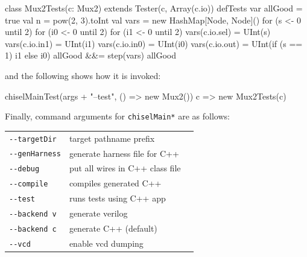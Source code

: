 \documentclass[10pt,twocolumn]{article}
\def\code#1{{\small\tt #1}}
\begin{document}
\begin{scala}
class Mux2Tests(c: Mux2) 
    extends Tester(c, Array(c.io)) {  
  defTests {
    var allGood = true
    val n = pow(2, 3).toInt
    val vars = new HashMap[Node, Node]()
    for (s <- 0 until 2) {
    for (i0 <- 0 until 2) {
    for (i1 <- 0 until 2) {
      vars(c.io.sel) = UInt(s)
      vars(c.io.in1) = UInt(i1)
      vars(c.io.in0) = UInt(i0)
      vars(c.io.out) = UInt(if (s == 1) i1 else i0)
      allGood &&= step(vars)
    } } } 
    allGood
  }
}
\end{scala}

\noindent
and the following shows how it is invoked:

\begin{scala}
chiselMainTest(args + "--test", () => new Mux2()){ 
  c => new Mux2Tests(c) 
}
\end{scala}

% 

Finally, command arguments for \code{chiselMain*} are as follows: \\

\begin{tabular}{lll}
\verb+--targetDir+ & target pathname prefix \\
\verb+--genHarness+ & generate harness file for C++ \\
\verb+--debug+ & put all wires in C++ class file \\
\verb+--compile+ & compiles generated C++ \\
\verb+--test+ & runs tests using C++ app \\
\verb+--backend v+ & generate verilog \\ 
\verb+--backend c+ & generate C++ (default)\\
\verb+--vcd+ & enable vcd dumping \\
\end{tabular}
\end{document}
